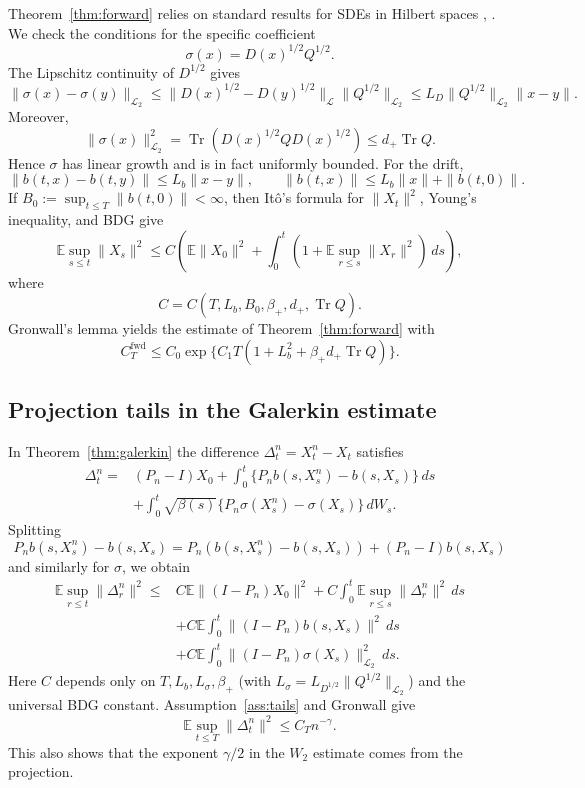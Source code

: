 \documentclass{article}
\newcommand{\LL}{\mathcal L}
\newcommand{\LLtwo}{\mathcal L_2}
\newcommand{\E}{\mathbb E}
\newcommand{\Tr}{\operatorname{Tr}}
\begin{document}
Theorem~\ref{thm:forward} relies on standard results for SDEs in Hilbert
spaces \cite[Ch.~7]{DaPratoZabczyk}, \cite[Ch.~4]{PrevotRockner}. We check the
conditions for the specific coefficient
\[
        \sigma(x)=D(x)^{1/2}Q^{1/2}.
\]
The Lipschitz continuity of \(D^{1/2}\) gives
\[
        \|\sigma(x)-\sigma(y)\|_{\LLtwo}
        \le
        \|D(x)^{1/2}-D(y)^{1/2}\|_{\LL}\|Q^{1/2}\|_{\LLtwo}
        \le
        L_D\|Q^{1/2}\|_{\LLtwo}\|x-y\|.
\]
Moreover,
\[
        \|\sigma(x)\|_{\LLtwo}^2
        =
        \Tr(D(x)^{1/2}QD(x)^{1/2})
        \le
        d_+\Tr Q .
\]
Hence \(\sigma\) has linear growth and is in fact uniformly bounded. For the
drift,
\[
        \|b(t,x)-b(t,y)\|\le L_b\|x-y\|,
        \qquad
        \|b(t,x)\|\le L_b\|x\|+\|b(t,0)\|.
\]
If \(B_0:=\sup_{t\le T}\|b(t,0)\|<\infty\), then It\^o's formula for
\(\|X_t\|^2\), Young's inequality, and BDG give
\[
        \E\sup_{s\le t}\|X_s\|^2
        \le
        C\left(\E\|X_0\|^2+
        \int_0^t(1+\E\sup_{r\le s}\|X_r\|^2)\,ds\right),
\]
where
\[
        C=C(T,L_b,B_0,\beta_+,d_+,\Tr Q).
\]
Gronwall's lemma yields the estimate of Theorem~\ref{thm:forward} with
\[
        C_T^{\mathrm{fwd}}\le C_0\exp\{C_1T(1+L_b^2+\beta_+d_+\Tr Q)\}.
\]

\subsection{Projection tails in the Galerkin estimate}

In Theorem~\ref{thm:galerkin} the difference \(\Delta_t^n=X_t^n-X_t\)
satisfies
\[
\begin{aligned}
\Delta_t^n
=&(P_n-I)X_0
+\int_0^t\{P_nb(s,X_s^n)-b(s,X_s)\}\,ds\\
&+\int_0^t\sqrt{\beta(s)}
\{P_n\sigma(X_s^n)-\sigma(X_s)\}\,dW_s .
\end{aligned}
\]
Splitting
\[
        P_nb(s,X_s^n)-b(s,X_s)
        =
        P_n(b(s,X_s^n)-b(s,X_s))+(P_n-I)b(s,X_s)
\]
and similarly for \(\sigma\), we obtain
\[
\begin{aligned}
\E\sup_{r\le t}\|\Delta_r^n\|^2
\le& C\E\|(I-P_n)X_0\|^2
+C\int_0^t\E\sup_{r\le s}\|\Delta_r^n\|^2\,ds\\
&+C\E\int_0^t\|(I-P_n)b(s,X_s)\|^2\,ds\\
&+C\E\int_0^t\|(I-P_n)\sigma(X_s)\|_{\LLtwo}^2\,ds .
\end{aligned}
\]
Here \(C\) depends only on \(T,L_b,L_\sigma,\beta_+\) (with \(L_\sigma=L_{D^{1/2}}\|Q^{1/2}\|_{\LLtwo}\)) and the universal BDG
constant. Assumption~\ref{ass:tails} and Gronwall give
\[
        \E\sup_{t\le T}\|\Delta_t^n\|^2\le C_T n^{-\gamma}.
\]
This also shows that the exponent \(\gamma/2\) in the \(W_2\) estimate comes from the projection.
\end{document}
